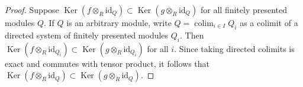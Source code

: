 \documentclass[10pt,a4paper]{amsart}
\theoremstyle{plain}
\theoremstyle{definition}
\theoremstyle{remark}
\numberwithin{equation}{subsection}
\def\colim{\mathop{\mathrm{colim}}\nolimits}
\def\Ker{\mathop{\mathrm{Ker}}}
\begin{document}
\begin{proof}
Suppose $\Ker(f \otimes_R \text{id}_Q) \subset \Ker(g \otimes_R
\text{id}_Q)$ for all finitely presented modules $Q$.  If $Q$ is an
arbitrary module, write $Q = \colim_{i \in I} Q_i$ as a colimit of a
directed
system of finitely presented modules $Q_i$.  Then $\Ker(f \otimes_R
\text{id}_{Q_i}) \subset \Ker(g \otimes_R \text{id}_{Q_i})$ for
all $i$.  Since taking directed colimits is exact and commutes with tensor
product, it follows that $\Ker(f \otimes_R \text{id}_Q) \subset \Ker(g
\otimes_R \text{id}_Q)$.
\end{proof}
\end{document}
